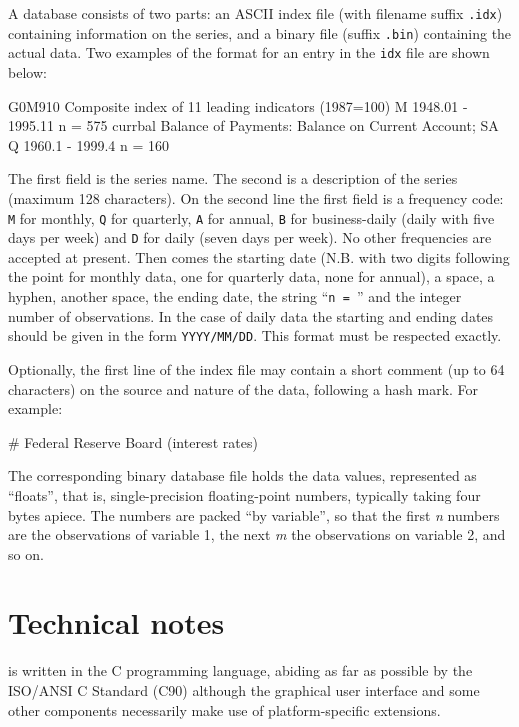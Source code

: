 A  database consists of two parts: an ASCII index file
(with filename suffix \verb+.idx+) containing information on the
series, and a binary file (suffix \verb+.bin+) containing the actual
data.  Two examples of the format for an entry in the \verb+idx+ file
are shown below:

\begin{code}
G0M910  Composite index of 11 leading indicators (1987=100) 
M 1948.01 - 1995.11  n = 575
currbal Balance of Payments: Balance on Current Account; SA 
Q 1960.1 - 1999.4 n = 160
\end{code}

The first field is the series name.  The second is a description of
the series (maximum 128 characters).  On the second line the first
field is a frequency code: \verb+M+ for monthly, \verb+Q+ for
quarterly, \verb+A+ for annual, \verb+B+ for business-daily (daily
with five days per week) and \verb+D+ for daily (seven days per week).
No other frequencies are accepted at present.  Then comes the starting
date (N.B. with two digits following the point for monthly data, one
for quarterly data, none for annual), a space, a hyphen, another
space, the ending date, the string ``\verb+n = +'' and the integer
number of observations. In the case of daily data the starting and
ending dates should be given in the form \verb+YYYY/MM/DD+. This
format must be respected exactly.

Optionally, the first line of the index file may contain a short
comment (up to 64 characters) on the source and nature of the data,
following a hash mark.  For example:

\begin{code}
# Federal Reserve Board (interest rates)
\end{code}

The corresponding binary database file holds the data values,
represented as ``floats'', that is, single-precision floating-point
numbers, typically taking four bytes apiece.  The numbers are packed
``by variable'', so that the first \emph{n} numbers are the
observations of variable 1, the next \emph{m} the observations on
variable 2, and so on.

\chapter{Technical notes}
\label{app-technote}

 is written in the C programming language, abiding as far
as possible by the ISO/ANSI C Standard (C90) although the graphical
user interface and some other components necessarily make use of
platform-specific extensions.
  
